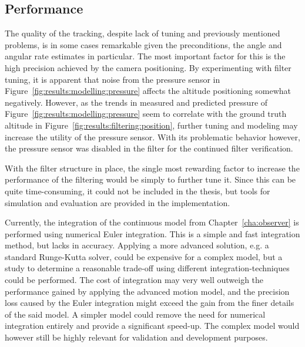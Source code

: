         \subsection{Performance}
            The quality of the tracking, despite lack of tuning and previously
            mentioned problems, is in some cases remarkable given the
            preconditions, the angle and angular rate estimates in particular.
            The most important factor for this is the high precision achieved by the
            camera positioning. By experimenting with filter tuning, it
            is apparent that noise from the pressure sensor
            in Figure~\ref{fig:results:modelling:pressure} affects the altitude positioning
            somewhat negatively. However, as the trends in measured and predicted pressure of Figure~\ref{fig:results:modelling:pressure}
            seem to correlate with the ground truth altitude in Figure~\ref{fig:results:filtering:position},
            further tuning and modeling may increase the utility of the pressure sensor.
            With its problematic behavior however, the pressure sensor was
            disabled in the filter for the continued filter verification.

            With the filter structure in place, the single
            most rewarding factor to increase the performance of the filtering
            would be simply to further tune it. Since this can be quite time-consuming,
            it could not be included in the thesis, but tools for simulation
            and evaluation are provided in the implementation.

            Currently, the integration of the continuous model from Chapter~\ref{cha:observer}
            is performed using numerical Euler integration.
            This is a simple and fast integration method, but lacks in accuracy.
            Applying a more advanced solution, e.g. a standard Runge-Kutta solver,
            could be expensive for a complex model, but a study to determine
            a reasonable trade-off using different integration-techniques could be performed.
            The cost of integration may very well outweigh
            the performance gained by applying the advanced motion model,
            and the precision loss caused by the Euler integration might
            exceed the gain from the finer details of the said model.
            A simpler model could remove the need for numerical integration
            entirely and provide a significant speed-up. The complex model
            would however still be highly relevant for validation and
            development purposes.

